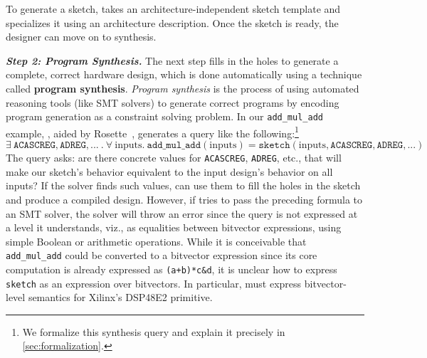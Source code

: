 To generate a sketch,
  \lr takes an architecture-independent
  sketch template
  and specializes it using an
  architecture description.
Once the sketch is ready,
  the designer can move on to synthesis.

\textit{\textbf{Step 2: Program Synthesis.}}
  The next step 
  fills
  in the holes to generate
  a complete, correct
  hardware design,
  which is done automatically
  using a technique called
  \textbf{program synthesis}.
\textit{Program synthesis} is the process of
  using automated reasoning tools
  (like SMT solvers) 
  to generate correct programs
  by encoding program generation
  as a constraint solving problem.
In our \texttt{add\_mul\_add} example,
  \lr, aided  by
  Rosette~\cite{torlak2013growing,torlak2014lightweight}, 
  generates a query like the following:\footnote{
  We formalize this synthesis query and explain it precisely in \cref{sec:formalization}.
}
\footnotesize
$$\exists \ \mathtt{ACASCREG}, \mathtt{ADREG}, ...\ .\ \forall \ \mathrm{inputs} . \ 
  \texttt{add\_mul\_add}(\mathrm{inputs}) 
  = \texttt{sketch}(\mathrm{inputs}, \mathtt{ACASCREG}, \mathtt{ADREG}, ...)
$$
\normalsize
The query asks:
  are there concrete values for
  \texttt{ACASCREG}, \texttt{ADREG}, etc.,
  that will make our sketch's behavior
  equivalent to the input design's behavior
  on all inputs?
If the solver finds such values,
\lr can use them to fill the holes
  in the sketch
  and produce a compiled design.
However, if \lr tries to pass the preceding formula
  to an SMT solver,
  the solver will throw an error since
  the query is not expressed
  at a level 
 it understands, viz., %
  as equalities
  between bitvector expressions,
  using simple Boolean or arithmetic
  operations.
While it is conceivable that \texttt{add\_mul\_add}
  could be converted to
  a bitvector expression
  since its core computation is already
  expressed as
  \texttt{(a+b)*c\&d},
it is unclear how to express
  \texttt{sketch}
  as an expression over bitvectors.
In particular, \lr must express
  bitvector-level semantics
  for Xilinx's DSP48E2 primitive.

